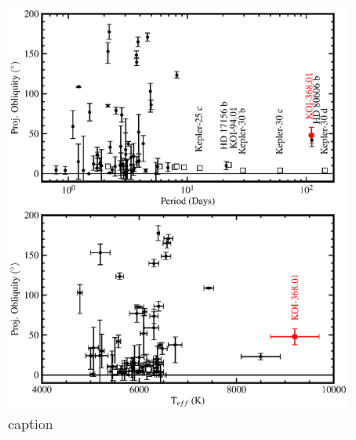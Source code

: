 \documentclass[apjl]{emulateapj}
\begin{document}
\begin{figure}[h]
  \centering
  \includegraphics[width=9cm]{period_obliq.eps}
  \caption{caption}
  \label{fig:periodobliq}
\end{figure}



\end{document}
